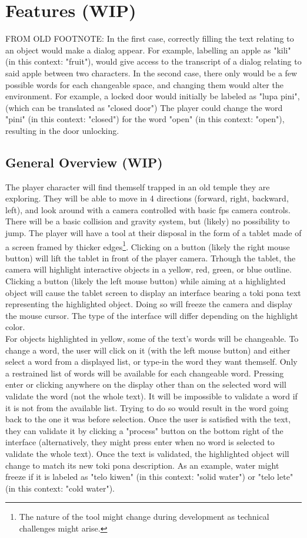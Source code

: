 \documentclass{scrartcl}
\begin{document}
	\section{Features (WIP)}
		FROM OLD FOOTNOTE: In the first case, correctly filling the text relating to an object would make a dialog appear. For example, labelling an apple as "kili" (in this context: "fruit"), would give access to the transcript of a dialog relating to said apple between two characters. In the second case, there only would be a few possible words for each changeable space, and changing them would alter the environment. For example, a locked door would initially be labeled as "lupa pini", (which can be translated as "closed door") The player could change the word "pini" (in this context: "closed") for the word "open" (in this context: "open"), resulting in the door unlocking.
		\subsection{General Overview (WIP)}
			The player character will find themself trapped in an old temple they are exploring. They will be able to move in 4 directions (forward, right, backward, left), and look around with a camera controlled with basic fps camera controls. There will be a basic collision and gravity system, but (likely) no possibility to jump. The player will have a tool at their disposal in the form of a tablet made of a screen framed by thicker edges\footnote{The nature of the tool might change during development as technical challenges might arise.}. Clicking on a button (likely the right mouse button) will lift the tablet in front of the player camera. Trhough the tablet, the camera will highlight interactive objects in a yellow, red, green, or blue outline. Clicking a button  (likely the left mouse button) while aiming at a highlighted object will cause the tablet screen to display an interface bearing a toki pona text representing the highlighted object. Doing so will freeze the camera and display the mouse cursor. The type of the interface will differ depending on the highlight color.\\
			For objects highlighted in yellow, some of the text's words will be changeable. To change a word, the user will click on it (with the left mouse button) and either select a word from a displayed list, or type-in the word they want themself. Only a restrained list of words will be available for each changeable word. Pressing enter or clicking anywhere on the display other than on the selected word will validate the word (not the whole text). It will be impossible to validate a word if it is not from the available list. Trying to do so would result in the word going back to the one it was before selection. Once the user is satisfied with the text, they can validate it by clicking a "process" button on the bottom right of the interface (alternatively, they might press enter when no word is selected to validate the whole text). Once the text is validated, the highlighted object will change to match its new toki pona description. As an example, water might freeze if it is labeled as "telo kiwen" (in this context: "solid water") or "telo lete" (in this context: "cold water").\\
\end{document}
